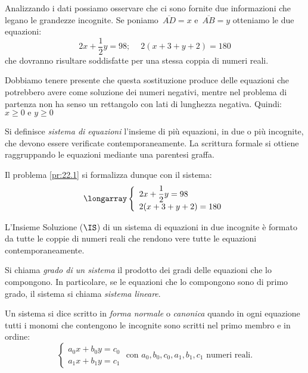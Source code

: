 Analizzando i dati possiamo osservare che ci sono fornite due
informazioni che legano le grandezze incognite. 
Se poniamo~\(\overline{AD}=x\) e~\(\overline{AB}=y\)
otteniamo le due equazioni:
\[2x+\frac{1}{2}y=98;\quad~2(x+3+y+2)=180\]
che dovranno risultare soddisfatte per una stessa coppia di numeri
reali.

\begin{osservazione}
 Dobbiamo tenere presente che questa sostituzione produce delle equazioni 
 che potrebbero avere come soluzione dei numeri negativi, mentre nel problema 
 di partenza non ha senso un rettangolo con lati di lunghezza negativa.
 Quindi:~\(x \geqslant 0 \text{ e } y \geqslant 0\)
\end{osservazione}

\begin{definizione}
Si definisce \emph{sistema di equazioni} l'insieme di più equazioni, 
in due o più incognite,
che devono essere verificate contemporaneamente. La scrittura formale
si ottiene raggruppando le equazioni mediante una parentesi graffa.
\end{definizione}

Il problema \ref{pr:22.1} si formalizza dunque con il sistema:
\[\longarray\left\{\begin{array}{l}
 2x+\dfrac{1}{2}y=98 \\
 2(x+3+y+2)=180
\end{array}\right.\]

\begin{definizione}
L'Insieme Soluzione (\(\IS\)) di un sistema di equazioni in
due incognite è formato da tutte le coppie di numeri reali
che rendono vere tutte le equazioni
contemporaneamente.
\end{definizione}

\begin{definizione}
Si chiama \emph{grado di un sistema} il prodotto dei gradi delle
equazioni che lo compongono. In particolare, se le equazioni che lo
compongono sono di primo grado, il sistema si chiama \emph{sistema lineare}.
\end{definizione}

\begin{definizione}
Un sistema si dice scritto in \emph{forma normale} o \emph{canonica} 
quando in ogni equazione tutti i monomi che contengono le incognite sono 
scritti nel primo membro e in ordine:
\[\left\{\begin{array}{l}
 a_{0}x+b_{0}y=c_{0} \\
 a_{1}x+b_{1}y=c_{1} 
\end{array}\right.
\text{ con }a_{0}, b_{0}, c_{0}, a_{1}, b_{1}, c_{1}\text{ numeri reali.}\]
\end{definizione}

